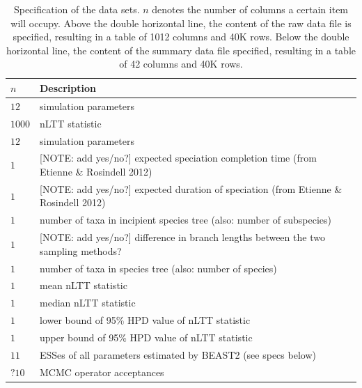 \documentclass{article}
\begin{document}
\begin{table}
  \centering 
  \begin{tabular}{l l}
    \hline
    $n$ & Description \\
    \hline
    \hline
    $12$   & simulation parameters \\
    $1000$ & nLTT statistic \\
    \hline
    \hline
    $12$   & simulation parameters \\
    $1$ & [NOTE: add yes/no?] expected speciation completion time (from Etienne \& Rosindell 2012) \\
    $1$ & [NOTE: add yes/no?] expected duration of speciation (from Etienne \& Rosindell 2012) \\
    $1$ & number of taxa in incipient species tree (also: number of subspecies) \\
    $1$ & [NOTE: add yes/no?] difference in branch lengths between the two sampling methods? \\
    $1$ & number of taxa in species tree (also: number of species) \\
    $1$ & mean nLTT statistic \\
    $1$ & median nLTT statistic \\
    $1$ & lower bound of 95\% HPD value of nLTT statistic \\
    $1$ & upper bound of 95\% HPD value of nLTT statistic \\
    $11$ & ESSes of all parameters estimated by BEAST2 (see specs below) \\
    $?10$ & MCMC operator acceptances\\
    \hline
  \end{tabular}
  \caption{
    Specification of the data sets. $n$ denotes the number
    of columns a certain item will occupy. Above the double horizontal line,
    the content of the raw data file is specified, resulting in a table of 
    1012 columns and 40K rows. Below the double horizontal line,
    the content of the summary data file specified, resulting in a table of
    42 columns and 40K rows.
  }
  \label{table:raw_data_set_specs}
\end{table}
\end{document}

